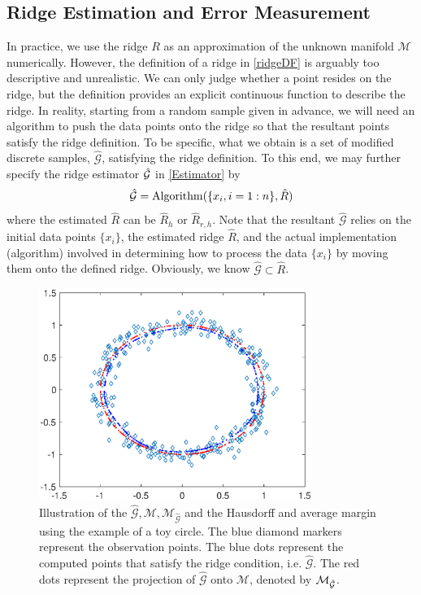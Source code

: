 \documentclass[aos,preprint]{imsart}
\theoremstyle{remark}
\begin{document}
\subsection{Ridge Estimation and Error Measurement}
In practice, we use the ridge $R$ as an approximation of the unknown manifold $\mathcal M$ numerically. However, the definition of a ridge in \eqref{ridgeDF} is arguably too descriptive and unrealistic. We can only judge whether a point resides on the ridge, but the definition provides an explicit continuous function to describe the ridge. In reality, starting from a random sample given in advance, we will need an algorithm to push the data points onto the ridge so that the resultant points satisfy the ridge definition. To be specific, what we obtain is a set of modified discrete samples, $\hat{\mathcal G}$, satisfying the ridge definition. To this end, we may further specify the ridge estimator $\hat{\cal G}$ in \eqref{Estimator} by
\[
\hat{\mathcal G} = {\rm Algorithm}(\{x_i, i=1:n\},  \hat{R})
\]
where the estimated $\hat{R}$ can be $\hat{R}_h$ or $\hat{R}_{r,h}$. Note that the resultant $\hat{\mathcal G}$ relies on the initial data points $\{x_i\}$, the estimated ridge $\hat{R}$, and the actual implementation (algorithm) involved in determining how to process the data $\{x_i\}$ by moving them onto the defined ridge. Obviously, we know $\hat{\mathcal G} \subset \hat{R}$.
\begin{figure}[htbp] %
   \centering
   \includegraphics[width=3.5in]{introduction_demo.eps} 
      \caption{Illustration of the $\hat{\mathcal G},\mathcal M, \mathcal M_{\hat{\mathcal G}}$ and the Hausdorff and average margin using the example of a toy circle. The blue diamond markers represent the observation points. The blue dots represent the computed points that satisfy the ridge condition, i.e. $\hat{\mathcal G}$. The red dots represent the projection of $\hat{\mathcal G}$ onto $\mathcal M$, denoted by $\cal M_{\hat{G}}$. }
   \label{fig:example}
\end{figure}
\end{document}
